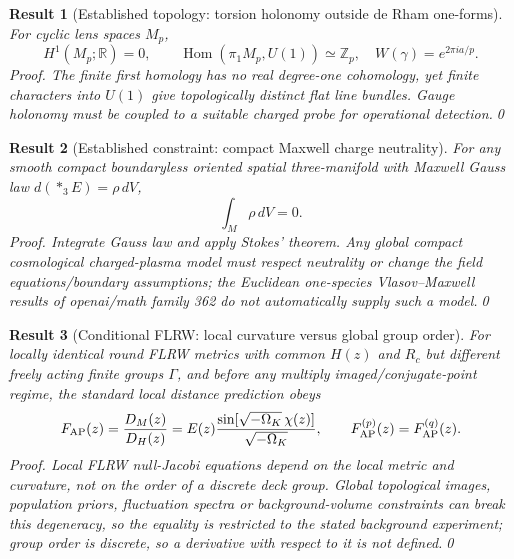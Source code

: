 \documentclass[aps,prd,onecolumn,notitlepage,groupedaddress,11pt]{revtex4-2}
\newtheorem{result}{Result}
\begin{document}
\begin{result}[\textsf{Established topology}: torsion holonomy outside de Rham one-forms]\label{new:136}
For cyclic lens spaces $M_p$,
\begin{equation}\label{new:eq136}
H^1(M_p;\mathbb R)=0,\qquad \operatorname{Hom}(\pi_1M_p,U(1))\simeq\mathbb Z_p,
\quad W(\gamma)=e^{2\pi ia/p}.
\end{equation}
\textit{Proof.} The finite first homology has no real degree-one cohomology, yet finite characters into $U(1)$ give topologically distinct flat line bundles. Gauge holonomy must be coupled to a suitable charged probe for operational detection.\qed
\end{result}
\begin{result}[\textsf{Established constraint}: compact Maxwell charge neutrality]\label{new:137}
For any smooth compact boundaryless oriented spatial three-manifold with Maxwell Gauss law $d(*_3 E)=\rho\,dV$,
\begin{equation}\label{new:eq137}
\int_M\rho\,dV=0.
\end{equation}
\textit{Proof.} Integrate Gauss law and apply Stokes' theorem. Any global compact cosmological charged-plasma model must respect neutrality or change the field equations/boundary assumptions; the Euclidean one-species Vlasov--Maxwell results of openai/math family 362 do not automatically supply such a model.\qed
\end{result}
\begin{result}[\textsf{Conditional FLRW}: local curvature versus global group order]\label{new:138}
For locally identical round FLRW metrics with common $H(z)$ and $R_c$ but different freely acting finite groups $\Gamma$, and before any multiply imaged/conjugate-point regime, the standard local distance prediction obeys
\begin{equation}\label{new:eq138}
F_{\rm AP}(z)=\frac{D_M(z)}{D_H(z)}=E(z)\frac{\sin[\sqrt{-\Omega_K}\,\chi(z)]}{\sqrt{-\Omega_K}},\qquad F_{\rm AP}^{(p)}(z)=F_{\rm AP}^{(q)}(z).
\end{equation}
\textit{Proof.} Local FLRW null-Jacobi equations depend on the local metric and curvature, not on the order of a discrete deck group. Global topological images, population priors, fluctuation spectra or background-volume constraints can break this degeneracy, so the equality is restricted to the stated background experiment; group order is discrete, so a derivative with respect to it is not defined.\qed
\end{result}
\end{document}
